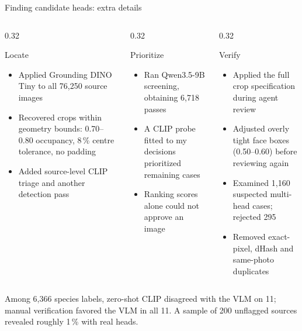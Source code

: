 \documentclass[aspectratio=169,10pt,t]{beamer}
\begin{document}
\begin{frame}{Finding candidate heads: extra details}
\small
\begin{columns}[T]
\begin{column}{0.32\linewidth}
\begin{block}{Locate}
\footnotesize\begin{itemize}\setlength{\itemsep}{1pt}
\item Applied Grounding DINO Tiny to all 76{,}250 source images
\item Recovered crops within geometry bounds: 0.70--0.80 occupancy, 8\,\% centre tolerance, no padding
\item Added source-level CLIP triage and another detection pass
\end{itemize}
\end{block}
\end{column}
\begin{column}{0.32\linewidth}
\begin{block}{Prioritize}
\footnotesize\begin{itemize}\setlength{\itemsep}{1pt}
\item Ran Qwen3.5-9B screening, obtaining 6{,}718 passes
\item A CLIP probe fitted to my decisions prioritized remaining cases
\item Ranking scores alone could not approve an image
\end{itemize}
\end{block}
\end{column}
\begin{column}{0.32\linewidth}
\begin{block}{Verify}
\footnotesize\begin{itemize}\setlength{\itemsep}{1pt}
\item Applied the full crop specification during agent review
\item Adjusted overly tight face boxes (0.50--0.60) before reviewing again
\item Examined 1{,}160 suspected multi-head cases; rejected 295
\item Removed exact-pixel, dHash and same-photo duplicates
\end{itemize}
\end{block}
\end{column}
\end{columns}
\vspace{3pt}\footnotesize Among 6{,}366 species labels, zero-shot CLIP disagreed with the VLM on 11; manual verification favored the VLM in all 11. A sample of 200 unflagged sources revealed roughly 1\,\% with real heads.
\end{frame}
\end{document}
